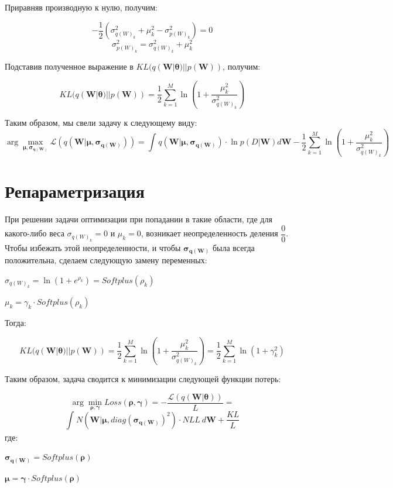 \documentclass{article}
\newcommand{\argmin}{\arg\!\min}
\newcommand{\argmax}{\arg\!\max}
\begin{document}
Приравняв производную к нулю, получим:

\[
-\dfrac{1}{2}(\sigma_{{q(W)_{k}}}^2 + \mu_{k}^2 - \sigma_{{p(W)_{k}}}^2) = 0
\]
\[
\sigma_{{p(W)_{k}}}^2 = \sigma_{{q(W)_{k}}}^2 + \mu_{k}^2
\]

Подставив полученное выражение в $KL(q(\mathbf{W} | \pmb{\theta}) || p(\mathbf{W}))$, получим:

\[
KL(q(\mathbf{W} | \pmb{\theta}) || p(\mathbf{W})) =
\dfrac{1}{2}\sum_{k=1}^{M}\ln({1 + \dfrac{\mu_{k}^2}{\sigma_{{q(W)_{k}}}^2}})
\]

Таким образом, мы свели задачу к следующему виду:
\[
\argmax_{\pmb{\mu}, \pmb{\sigma_{q(\mathbf{W})}}} \mathcal{L}(q(\mathbf{W} | \pmb{\mu}, \pmb{\sigma_{q(\mathbf{W})}})) =
\int_{}{} q(\mathbf{W} | \pmb{\mu}, \pmb{\sigma_{q(\mathbf{W})}}) \cdot \ln{p(D | \mathbf{W})} d\mathbf{W} - \dfrac{1}{2}\sum_{k=1}^{M}\ln({1 + \dfrac{\mu_{k}^2}{\sigma_{{q(W)_{k}}}^2}})
\]

\section{Репараметризация}

При решении задачи оптимизации при попадании в такие области, где для какого-либо веса $\sigma_{{q(W)_{k}}} = 0$ и $\mu_{k} = 0$, возникает неопределенность деления $\dfrac{0}{0}$. Чтобы избежать этой неопределенности, и чтобы $\pmb{\sigma_{q(\mathbf{W})}}$ была всегда положительна, сделаем следующую замену переменных:

$\sigma_{{q(W)_{k}}} = \ln({1 + e^{\rho_{k}}}) = Softplus(\rho_{k})$

$\mu_{k} = \gamma_{k} \cdot Softplus(\rho_{k})$

Тогда:

\[
KL(q(\mathbf{W} | \pmb{\theta}) || p(\mathbf{W})) =
\dfrac{1}{2}\sum_{k=1}^{M}\ln({1 + \dfrac{\mu_{k}^2}{\sigma_{{q(W)_{k}}}^2}}) =
\dfrac{1}{2}\sum_{k=1}^{M}\ln({1 + \gamma_{k}^{2}})
\]

Таким образом, задача сводится к минимизации следующей функции потерь:

\[
\argmin_{\pmb{\rho}, \pmb{\gamma}} Loss(\pmb{\rho}, \pmb{\gamma}) =
- \dfrac{\mathcal{L}(q(\mathbf{W} | \pmb{\theta}))}{L} =
\]\[
\int_{}{} N(\mathbf{W} | \pmb{\mu}, diag(\pmb{\sigma_{q(\mathbf{W})}})^{2}) \cdot NLL ~ d\mathbf{W} + \dfrac{KL}{L}
\] где:

$\pmb{\sigma_{q(\mathbf{W})}} = Softplus(\pmb{\rho})$

$\pmb{\mu} = \pmb{\gamma} \cdot Softplus(\pmb{\rho})$
\end{document}
